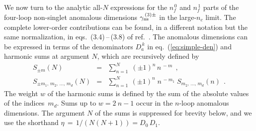 \documentclass[12pt]{article}
\newcommand{\bea}{\begin{eqnarray}}
\newcommand{\eea}{\end{eqnarray}}
\newcommand{\nn}{\nonumber}
\def\nc{{n_c}}
\def\nfz{{n^{\,0}_{\! f}}}
\def\nfo{{n^{\,1}_{\! f}}}
\begin{document}
\bigskip

We now turn to the analytic all-$N$ expressions for the $\nfz$ and $\nfo$ 
parts of the four-loop non-singlet anomalous dimensions 
$\gamma_{\rm ns}^{\,(3)\pm}$ in the large-$\nc$ limit. 
The complete lower-order contributions can be found, in a different 
notation but the same normalization, in eqs.~(3.4)$\,$--$\,$(3.8) of 
ref.~\cite{Moch:2004pa}. 
The anomalous dimensions can be expressed in terms of the denominators 
$D_a^{\,k}$ in eq.~(\ref{eq:simple-den}) and harmonic sums 
\cite{Vermaseren:1998uu,Blumlein:1998if} at argument $N$, which are 
recursively defined by
%
\bea
\label{eq:Hsum1}
  S_{\pm m}(N) &\!=\!& \sum_{n=1}^{N}\; (\pm 1)^n \, n^{\, -m}
\:\: , \nn \\
  S_{\pm m_1^{},\,m_2^{},\,\ldots,\,m_d}(N) &\!=\!& \sum_{n=1}^{N}\:
  (\pm 1)^{n} \; n^{\, -m_1^{}}\; S_{m_2^{},\,\ldots,\,m_d}(n)
\:\: .
\eea
%
The weight $w$ of the harmonic sums is defined by the sum of the absolute
values of the indices~$m_d$.  Sums up to $w = 2\:\!n-1$ occur in the
$n$-loop anomalous dimensions. 
The argument $N$ of the sums is suppressed for brevity below, and we use
the shorthand $\eta \,=\, 1/(N(N+1)) = D_0\, D_1$.
\end{document}
